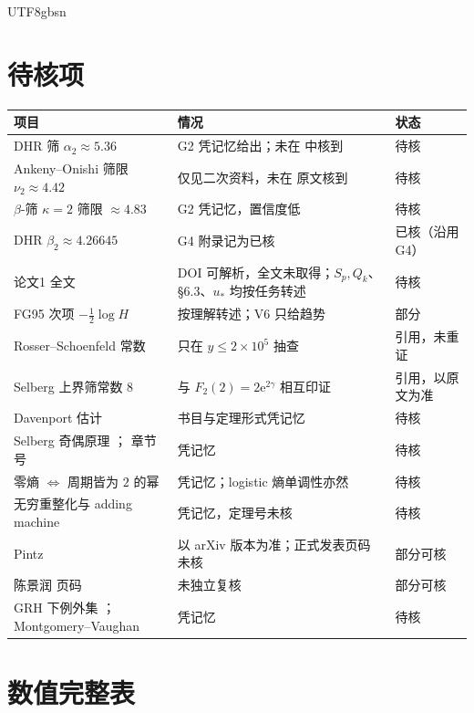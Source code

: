 \documentclass[11pt,a4paper]{article}
\newcommand{\ust}{u_{*}}               %
\newcommand{\ee}{\mathrm e}
\theoremstyle{plain}
\theoremstyle{definition}
\begin{document}
\begin{CJK}{UTF8}{gbsn}
\appendix
\section{待核项}\label{paper:app:pending}
\begin{center}
\small
\begin{tabular}{p{4.0cm}p{7.0cm}p{3.4cm}}
\hline
项目 & 情况 & 状态\\
\hline
DHR 筛 $\alpha_2\approx5.36$ & G2 凭记忆给出；未在 \cite{DHR88,DH08} 中核到 & 待核\\
Ankeny--Onishi 筛限 $\nu_2\approx4.42$ & 仅见二次资料，未在 \cite{AO65} 原文核到 & 待核\\
$\beta$-筛 $\kappa=2$ 筛限 $\approx4.83$ & G2 凭记忆，置信度低 & 待核\\
DHR $\beta_2\approx4.26645$ & G4 附录记为已核 & 已核（沿用 G4）\\
论文1 \cite{Wang26} 全文 & DOI 可解析，全文未取得；$S_p,Q_k$、\S6.3、$\ust$ 均按任务转述 & 待核\\
FG95 次项 $-\frac12\log H$ & 按理解转述；V6 只给趋势 & 部分\\
Rosser--Schoenfeld 常数 \cite{RS62} & 只在 $y\le2\times10^5$ 抽查 & 引用，未重证\\
Selberg 上界筛常数 $8$ \cite{HR74} & 与 $F_2(2)=2\ee^{2\gamma}$ 相互印证 & 引用，以原文为准\\
Davenport 估计 \cite{Dav37} & 书目与定理形式凭记忆 & 待核\\
Selberg 奇偶原理 \cite{Sel49}；\cite{FI10} 章节号 & 凭记忆 & 待核\\
零熵 $\iff$ 周期皆为 $2$ 的幂 \cite{BC92} & 凭记忆；logistic 熵单调性亦然 & 待核\\
无穷重整化与 adding machine \cite{dMvS93} & 凭记忆，定理号未核 & 待核\\
Pintz \cite{Pin18} & 以 arXiv 版本为准；正式发表页码未核 & 部分可核\\
陈景润 \cite{Chen73} 页码 & 未独立复核 & 部分可核\\
GRH 下例外集 \cite{HL24}；Montgomery--Vaughan \cite{MV75} & 凭记忆 & 待核\\
\hline
\end{tabular}
\end{center}

\section{数值完整表}\label{paper:app:tables}


\end{CJK}
\end{document}
